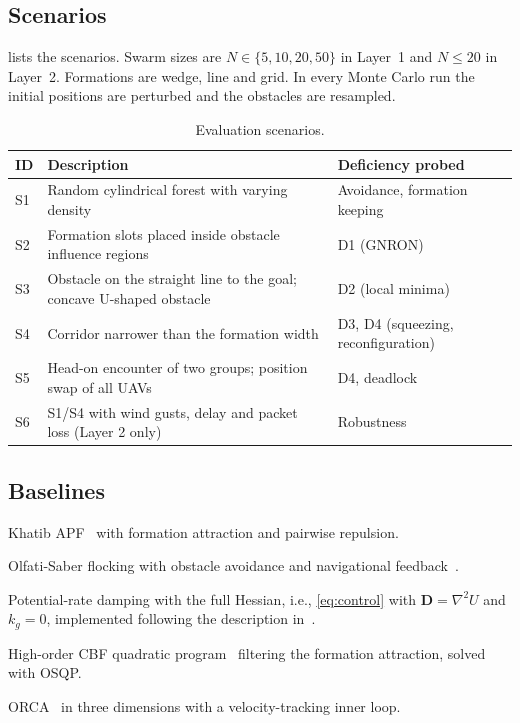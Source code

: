 \documentclass[11pt]{article}
\theoremstyle{definition}
\theoremstyle{remark}
\newcommand{\bD}{\mathbf{D}}
\begin{document}
\subsection{Scenarios}
 lists the scenarios. Swarm sizes are
$N\in\{5,10,20,50\}$ in Layer~1 and $N\le20$ in Layer~2. Formations are
wedge, line and grid. In every Monte Carlo run the initial positions are
perturbed and the obstacles are resampled.

\begin{table}[htbp]
\centering
\caption{Evaluation scenarios.}\label{tab:scenarios}
\small
\begin{tabular}{@{}l>{\raggedright}p{6.6cm}>{\raggedright\arraybackslash}p{4.2cm}@{}}
\toprule
ID & Description & Deficiency probed \\
\midrule
S1 & Random cylindrical forest with varying density & Avoidance, formation keeping \\
S2 & Formation slots placed inside obstacle influence regions & D1 (GNRON) \\
S3 & Obstacle on the straight line to the goal; concave U-shaped obstacle & D2 (local minima) \\
S4 & Corridor narrower than the formation width & D3, D4 (squeezing, reconfiguration) \\
S5 & Head-on encounter of two groups; position swap of all UAVs & D4, deadlock \\
S6 & S1/S4 with wind gusts, delay and packet loss (Layer 2 only) & Robustness \\
\bottomrule
\end{tabular}
\end{table}

\subsection{Baselines}
\begin{description}[style=unboxed,leftmargin=0pt,font=\normalfont\itshape]
  \item[B1] Khatib APF~\cite{khatib1986} with formation attraction and pairwise repulsion.
  \item[B2] Olfati-Saber flocking with obstacle avoidance and navigational feedback~\cite{olfati2006}.
  \item[B3] Potential-rate damping with the full Hessian, i.e.,
    \eqref{eq:control} with $\bD=\nabla^2U$ and $k_g=0$, implemented following
    the description in~\cite{li2024lowosc,han2025time}.
  \item[B4] High-order CBF quadratic program~\cite{wang2017barrier,xiao2022hocbf}
    filtering the formation attraction, solved with OSQP.
  \item[B5] ORCA~\cite{vandenberg2011orca} in three dimensions with a velocity-tracking inner loop.
\end{description}
\end{document}

